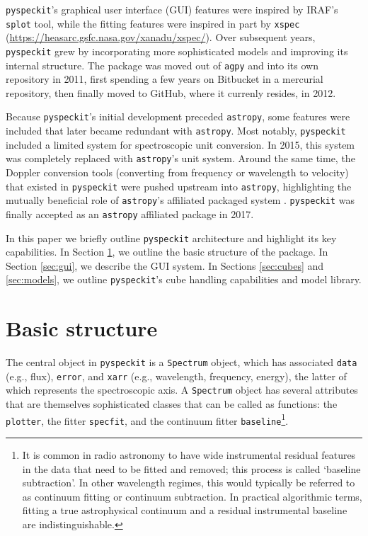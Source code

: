 \documentclass[twocolumn]{aastex62}
\newcommand{\pyspeckit}{\texttt{pyspeckit}\xspace}
\newcommand{\astropy}{\texttt{astropy}\xspace}
\begin{document}
\pyspeckit's graphical user interface (GUI) features were inspired by IRAF's
\texttt{splot} tool, while the fitting features were inspired in part by \texttt{xspec}
(\url{https://heasarc.gsfc.nasa.gov/xanadu/xspec/}).  Over subsequent years,
\pyspeckit grew by incorporating more sophisticated models  and improving its
internal structure.  The package was moved out of \texttt{agpy} and into its
own repository in 2011, first spending a few years on Bitbucket in a mercurial
repository, then finally moved to GitHub, where it currenly resides, in 2012.

Because \pyspeckit's initial development preceded \astropy, some features
were included that later became redundant with \astropy.  Most notably, \pyspeckit included
a limited system for spectroscopic unit conversion.  In 2015, this system
was completely replaced with \astropy's unit system.  Around the same time,
the Doppler conversion tools (converting from frequency or wavelength to
velocity) that existed in \pyspeckit were pushed upstream into \astropy,
highlighting the mutually beneficial role of \astropy's affiliated
packaged system \citep{Astropy_2018}.  \pyspeckit was finally
accepted as an \astropy affiliated package in 2017.


In this paper we briefly outline \texttt{pyspeckit} architecture and highlight
its key capabilities. In Section \ref{sec:basicstructure}, we  outline the
basic structure of the package.  In Section \ref{sec:gui}, we describe the GUI
system.  In Sections \ref{sec:cubes} and \ref{sec:models}, we outline
\pyspeckit's cube handling capabilities and model library.



\section{Basic structure}
\label{sec:basicstructure}
The central object in \pyspeckit is a \texttt{Spectrum} object, which has
associated \texttt{data} (e.g., flux), \texttt{error}, and \texttt{xarr} (e.g., wavelength,
frequency, energy), the latter of
which represents the spectroscopic axis.  A \texttt{Spectrum} object has
several attributes that are themselves sophisticated classes that can be called
as functions: the \texttt{plotter}, the fitter \texttt{specfit}, and the
continuum fitter \texttt{baseline}\footnote{It is common in radio astronomy to
have wide instrumental residual features in the data that need to be fitted and
removed; this process is called `baseline subtraction'.  In other wavelength
regimes, this would typically be referred to as continuum fitting or continuum
subtraction.  In practical algorithmic terms, fitting a true astrophysical
continuum and a residual instrumental baseline are indistinguishable.}.
\end{document}
